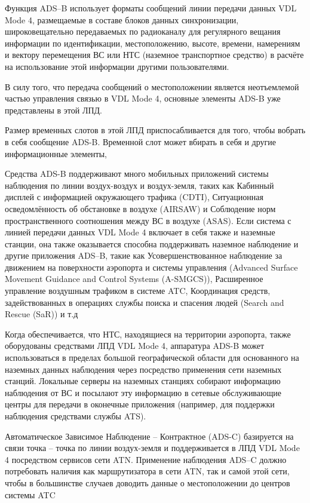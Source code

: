 \documentclass[a4paper,12pt]{report} %
\begin{document}
Функция ADS--B использует форматы сообщений линии передачи данных VDL Mode 4,
размещаемые в составе блоков данных синхронизации, широковещательно передаваемых
по радиоканалу для регулярного вещания информации по идентификации,
местоположению, высоте, времени, намерениям и вектору перемещения ВС или НТС
(наземное транспортное средство) в расчёте на использование этой информации
другими пользователями.

В силу того, что передача сообщений о местоположении является неотъемлемой
частью управления связью в VDL Mode 4, основные элементы ADS-B уже представлены
в этой ЛПД. 

Размер временных слотов в этой ЛПД приспосабливается для того, чтобы вобрать в себя
сообщение ADS-B. Временной слот может вбирать в себя и другие информационные элементы,

Средства ADS-B поддерживают много мобильных приложений системы наблюдения по
линии воздух-воздух и воздух-земля, таких как Кабинный дисплей с информацией
окружающего трафика (CDTI), Ситуационная осведомлённость об обстановке в
воздухе (AIRSAW) и Соблюдение норм пространственного соотношения между ВС в
воздухе (ASAS). Если система с линией передачи данных VDL Mode 4 включает в себя
также и наземные станции, она также оказывается способна поддерживать наземное
наблюдение и другие приложения ADS--B, такие как Усовершенствованное наблюдение
за движением на поверхности аэропорта и системы управления (Advanced Surface
Movement Guidance and Control Systems (A-SMGCS)), Расширенное управление
воздушным трафиком в системе ATC, Координация средств, задействованных в
операциях службы поиска и спасения людей (Search and Rescue (SaR)) и т.д 

Когда обеспечивается, что НТС, находящиеся на территории аэропорта, также
оборудованы средствами ЛПД VDL Mode 4, аппаратура ADS-B может использоваться в
пределах большой географической области для основанного на наземных данных наблюдения
через посредство применения сети наземных станций. Локальные серверы на наземных
станциях собирают информацию наблюдения от ВС и посылают эту информацию в
сетевые обслуживающие центры для передачи в оконечные приложения (например, для
поддержки наблюдения средствами службы ATS).

Автоматическое Зависимое Наблюдение – Контрактное (ADS-C) базируется на связи точка
– точка по линии воздух-земля и поддерживается в ЛПД VDL Mode 4 посредством сервисов
сети ATN. Применение наблюдения ADS--C должно потребовать наличия как маршрутизатора в
сети ATN, так и самой этой сети, чтобы в большинстве случаев доводить данные о
местоположении до центров системы ATC
\end{document}
